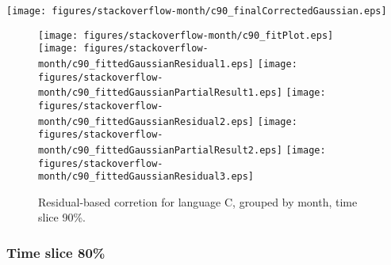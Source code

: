 \begin{center}
{\texttt{[image: figures/stackoverflow-month/c90\_finalCorrectedGaussian.eps]}}
\end{center}

\FloatBarrier

\begin{figure}[t]
\centering
{}
{\texttt{[image: figures/stackoverflow-month/c90\_fitPlot.eps]}}
{\texttt{[image: figures/stackoverflow-month/c90\_fittedGaussianResidual1.eps]}}
{\texttt{[image: figures/stackoverflow-month/c90\_fittedGaussianPartialResult1.eps]}}
{\texttt{[image: figures/stackoverflow-month/c90\_fittedGaussianResidual2.eps]}}
{\texttt{[image: figures/stackoverflow-month/c90\_fittedGaussianPartialResult2.eps]}}
{\texttt{[image: figures/stackoverflow-month/c90\_fittedGaussianResidual3.eps]}}
\caption{Residual-based corretion for language C, grouped by month, time slice 90\%.}
\end{figure}


\FloatBarrier


\subsubsection{Time slice 80\%}

